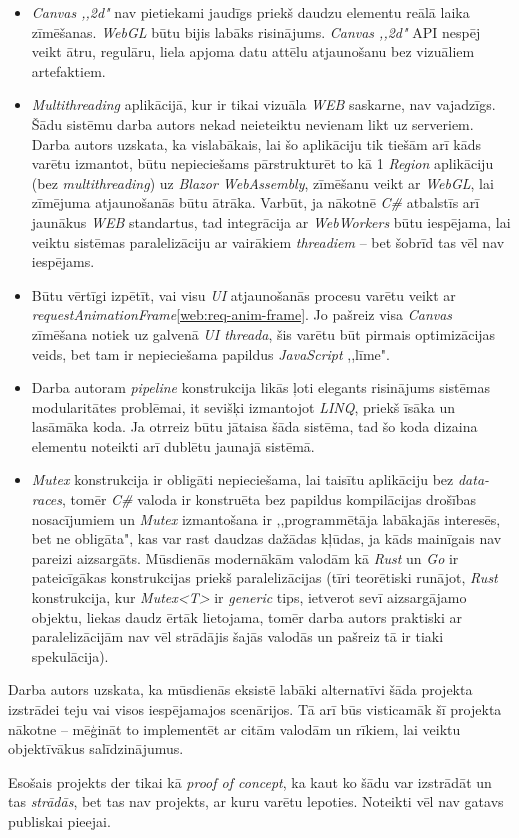 \begin{itemize}
    \item \emph{Canvas ,,2d"} nav pietiekami jaudīgs priekš daudzu elementu reālā laika
    zīmēšanas. \emph{WebGL} būtu bijis labāks risinājums. \emph{Canvas ,,2d"} API nespēj veikt
    ātru, regulāru, liela apjoma datu attēlu atjaunošanu bez vizuāliem artefaktiem.

    \item \emph{Multithreading} aplikācijā, kur ir tikai vizuāla \emph{WEB} saskarne, nav vajadzīgs.
    Šādu sistēmu darba autors nekad neieteiktu nevienam likt uz serveriem.
    Darba autors uzskata, ka vislabākais, lai šo aplikāciju tik tiešām arī kāds
    varētu izmantot, būtu nepieciešams pārstrukturēt to kā 1 \emph{Region} aplikāciju
    (bez \emph{multithreading}) uz \emph{Blazor WebAssembly}, zīmēšanu veikt ar
    \emph{WebGL}, lai zīmējuma atjaunošanās būtu ātrāka. Varbūt, ja nākotnē \emph{C\#}
    atbalstīs arī jaunākus \emph{WEB} standartus, tad integrācija ar
    \emph{WebWorkers} būtu iespējama, lai veiktu sistēmas paralelizāciju ar vairākiem
    \emph{threadiem} -- bet šobrīd tas vēl nav iespējams.

    \item Būtu vērtīgi izpētīt, vai visu \emph{UI} atjaunošanās procesu varētu veikt ar
    \emph{requestAnimationFrame}\ref{web:req-anim-frame}. Jo pašreiz visa \emph{Canvas}
    zīmēšana notiek uz galvenā \emph{UI threada}, šis varētu būt pirmais
    optimizācijas veids, bet tam ir nepieciešama papildus \emph{JavaScript} ,,līme".

    \item Darba autoram \emph{pipeline} konstrukcija likās ļoti elegants risinājums
    sistēmas modularitātes problēmai, it sevišķi izmantojot \emph{LINQ}, priekš īsāka un lasāmāka
    koda. Ja otrreiz būtu jātaisa šāda sistēma, tad šo koda dizaina elementu
    noteikti arī dublētu jaunajā sistēmā.

    \item \emph{Mutex} konstrukcija ir obligāti nepieciešama, lai taisītu aplikāciju
    bez \emph{data-races}, tomēr \emph{C\#} valoda ir konstruēta bez papildus kompilācijas
    drošības nosacījumiem un \emph{Mutex} izmantošana ir ,,programmētāja labākajās
    interesēs, bet ne obligāta", kas var rast daudzas dažādas kļūdas, ja kāds mainīgais
    nav pareizi aizsargāts. Mūsdienās modernākām valodām kā \emph{Rust} un \emph{Go}
    ir pateicīgākas konstrukcijas priekš paralelizācijas (tīri teorētiski runājot,
    \emph{Rust} konstrukcija, kur \emph{Mutex<T>} ir \emph{generic} tips, ietverot
    sevī aizsargājamo objektu, liekas daudz ērtāk lietojama, tomēr
    darba autors praktiski ar paralelizācijām nav vēl strādājis šajās valodās un
    pašreiz tā ir tiaki spekulācija).
\end{itemize}

Darba autors uzskata, ka mūsdienās eksistē labāki alternatīvi šāda projekta
izstrādei teju vai visos iespējamajos scenārijos. Tā arī būs visticamāk šī
projekta nākotne -- mēģināt to implementēt ar citām valodām un rīkiem, lai veiktu objektīvākus
salīdzinājumus.

Esošais projekts der tikai kā \emph{proof of concept}, ka kaut ko šādu var izstrādāt
un tas \emph{strādās}, bet tas nav projekts, ar kuru varētu lepoties. Noteikti vēl
nav gatavs publiskai pieejai.
